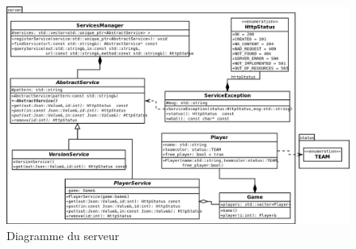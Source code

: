 \documentclass[12pt]{report}
\begin{document}
\newpage
\thispagestyle{empty}
\begin{landscape}
\begin{figure}[h]
    \begin{center}
    \includegraphics[scale=0.60]{server.png}
    \end{center}
    \caption{Diagramme du serveur}
\end{figure}
\end{landscape}
\end{document}
